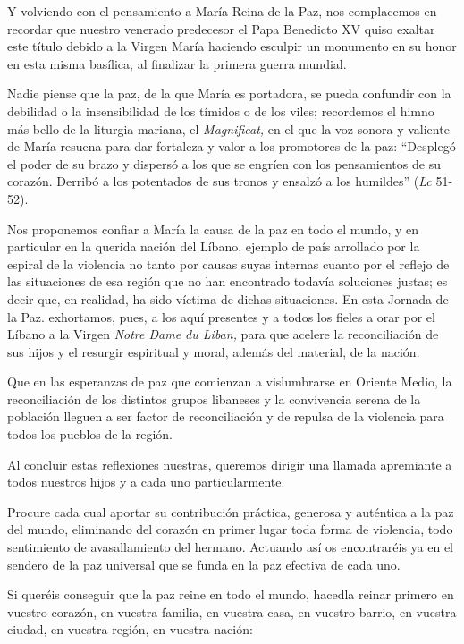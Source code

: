 Y volviendo con el pensamiento a María Reina de la Paz, nos complacemos
en recordar que nuestro venerado predecesor el Papa Benedicto XV quiso
exaltar este título debido a la Virgen María haciendo esculpir un
monumento en su honor en esta misma basílica, al finalizar la primera
guerra mundial.

Nadie piense que la paz, de la que María es portadora, se pueda
confundir con la debilidad o la insensibilidad de los tímidos o de los
viles; recordemos el himno más bello de la liturgia mariana, el
\emph{Magnificat,} en el que la voz sonora y valiente de María resuena
para dar fortaleza y valor a los promotores de la paz: ``Desplegó el
poder de su brazo y dispersó a los que se engríen con los pensamientos
de su corazón. Derribó a los potentados de sus tronos y ensalzó a los
humildes'' (\emph{Lc} 51-52).

Nos proponemos confiar a María la causa de la paz en todo el mundo, y en
particular en la querida nación del Líbano, ejemplo de país arrollado
por la espiral de la violencia no tanto por causas suyas internas cuanto
por el reflejo de las situaciones de esa región que no han encontrado
todavía soluciones justas; es decir que, en realidad, ha sido víctima de
dichas situaciones. En esta Jornada de la Paz. exhortamos, pues, a los
aquí presentes y a todos los fieles a orar por el Líbano a la Virgen
\emph{Notre Dame du Liban,} para que acelere la reconciliación de sus
hijos \emph{} y el resurgir espiritual y moral, además del material, de
la nación.

Que en las esperanzas de paz que comienzan a vislumbrarse en Oriente
Medio, la reconciliación de los distintos grupos libaneses y la
convivencia serena de la población lleguen a ser factor de
reconciliación y de repulsa de la violencia para todos los pueblos de la
región.

Al concluir estas reflexiones nuestras, queremos dirigir una llamada
apremiante a todos nuestros hijos y a cada uno particularmente.

Procure cada cual aportar su contribución práctica, generosa y auténtica
a la paz del mundo, eliminando del corazón en primer lugar toda forma de
violencia, todo sentimiento de avasallamiento del hermano. Actuando así
os encontraréis ya en el sendero de la paz universal que se funda en la
paz efectiva de cada uno.

Si queréis conseguir que la paz reine en todo el mundo, hacedla reinar
primero en vuestro corazón, en vuestra familia, en vuestra casa, en
vuestro barrio, en vuestra ciudad, en vuestra región, en vuestra nación:

